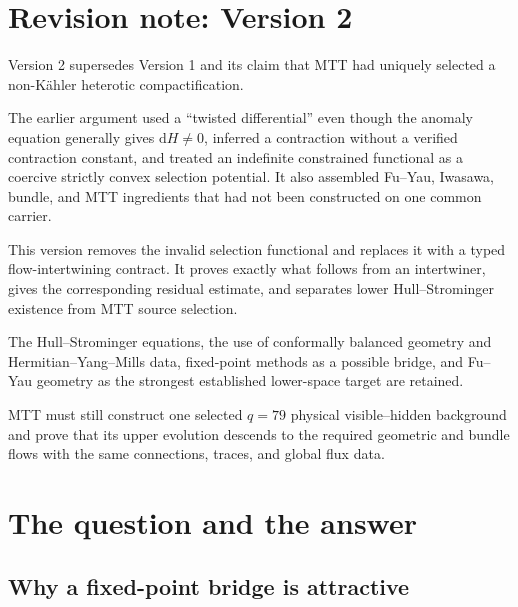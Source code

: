 \documentclass[11pt]{article}
\theoremstyle{definition}
\theoremstyle{remark}
\newcommand{\dd}{\mathrm d}
\begin{document}
\section*{Revision note: Version 2}
\begin{description}[leftmargin=2.4cm,style=nextline]
\item[Supersedes]
Version 2 supersedes Version 1 and its claim that MTT had uniquely selected a
non-K\"ahler heterotic compactification.

\item[Reason]
The earlier argument used a ``twisted differential'' even though the anomaly
equation generally gives \(\dd H\ne0\), inferred a contraction without a
verified contraction constant, and treated an indefinite constrained
functional as a coercive strictly convex selection potential.  It also
assembled Fu--Yau, Iwasawa, bundle, and MTT ingredients that had not been
constructed on one common carrier.

\item[Resolution]
This version removes the invalid selection functional and replaces it with a
typed flow-intertwining contract.  It proves exactly what follows from an
intertwiner, gives the corresponding residual estimate, and separates lower
Hull--Strominger existence from MTT source selection.

\item[Retained content]
The Hull--Strominger equations, the use of conformally balanced geometry and
Hermitian--Yang--Mills data, fixed-point methods as a possible bridge, and
Fu--Yau geometry as the strongest established lower-space target are retained.

\item[Remaining boundary]
MTT must still construct one selected \(q=79\) physical visible--hidden
background and prove that its upper evolution descends to the required
geometric and bundle flows with the same connections, traces, and global flux
data.
\end{description}

\tableofcontents

\section{The question and the answer}
\label{sec:intro}

\subsection{Why a fixed-point bridge is attractive}
\end{document}
